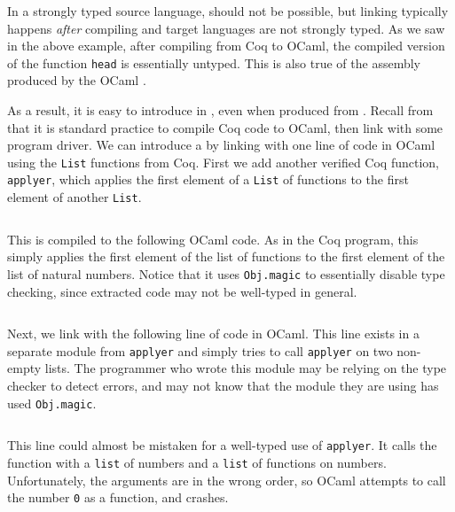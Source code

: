 In a strongly typed source language,  should not be
possible, but linking typically happens \emph{after} compiling and
 target languages are not strongly typed.
As we saw in the above example, after compiling from Coq to OCaml, the compiled
version of the function \texttt{head} is essentially untyped.
This is also true of the assembly produced by the OCaml .

As a result, it is easy to introduce  in
, even when produced from .
Recall from  that it is standard practice
to compile Coq code to OCaml, then link with some program driver.
We can introduce a  by linking with one line of code in
OCaml using the  \texttt{List} functions from Coq.
First we add another verified Coq function, \texttt{applyer}, which
applies the first element of a \texttt{List} of functions to the first
element of another \texttt{List}.
%
\inputminted[xleftmargin=1em,firstline=17,lastline=19,firstnumber=1]{coq}{chapters/intro/head-eg.v}%
%
\noindent This is compiled to the following OCaml code.
As in the Coq program, this simply applies the first element of the list of
functions to the first element of the list of natural numbers.
Notice that it uses \texttt{Obj.magic} to essentially disable type
checking, since extracted code may not be well-typed in general.
%
\inputminted[xleftmargin=1em,firstline=25,lastline=29,firstnumber=1]{ocaml}{chapters/intro/head.ml}%
%
Next, we link with the following line of code in OCaml.
This line exists in a separate module from \texttt{applyer} and
simply tries to call \texttt{applyer} on two non-empty lists.
The programmer who wrote this module may be relying on the type checker to
detect errors, and may not know that the module they are using has used
\texttt{Obj.magic}.
\inputminted[xleftmargin=1em,firstnumber=1]{ocaml}{chapters/intro/caller.ml}%
%
%
%
\noindent This line could almost be mistaken for a well-typed use of
\texttt{applyer}.
It calls the function with a \texttt{list} of numbers and a
\texttt{list} of functions on numbers.
Unfortunately, the arguments are in the wrong order, so OCaml attempts to call
the number \texttt{0} as a function, and crashes.

